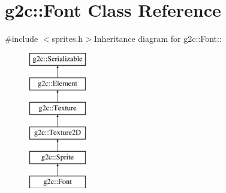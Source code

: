 \hypertarget{classg2c_1_1_font}{
\section{g2c::Font Class Reference}
\label{classg2c_1_1_font}
}


{\ttfamily \#include $<$sprites.h$>$}Inheritance diagram for g2c::Font::\begin{figure}[H]
\begin{center}
\leavevmode
\includegraphics[height=6cm]{classg2c_1_1_font}
\end{center}
\end{figure}
